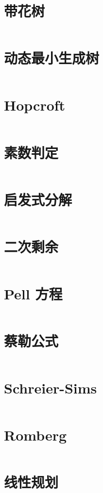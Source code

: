 \documentclass[titlepage,landscape,a4paper,10pt]{article}
\begin{document}
\begin{multicols}{2}
\begin{spacing}{0.8}
\section{带花树}
\inputminted{cpp}{src/带花树.cpp}

\section{动态最小生成树}
\inputminted{cpp}{src/动态最小生成树.cpp}

\section{Hopcroft}
\inputminted{cpp}{src/Hopcroft.cpp}

\section{素数判定}
\inputminted{cpp}{src/素数判定.cpp}

\section{启发式分解}
\inputminted{cpp}{src/启发式分解.cpp}

\section{二次剩余}
\inputminted{cpp}{src/二次剩余.cpp}

\section{Pell 方程}
\inputminted{cpp}{src/Pell方程.cpp}

\section{蔡勒公式}
\inputminted{cpp}{src/蔡勒公式.cpp}

\section{Schreier-Sims}
\inputminted{cpp}{improve/SchreierSims.cpp}

\section{Romberg}
\inputminted{cpp}{src/Romberg.cpp}

\section{线性规划}
\inputminted{cpp}{src/线性规划.cpp}


\end{spacing}
\end{multicols}
\end{document}
